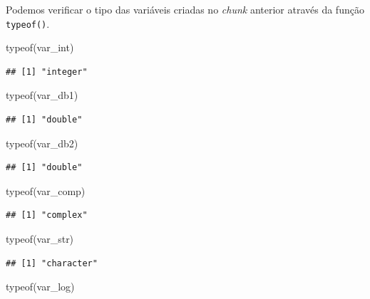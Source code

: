 \documentclass[
]{book}
\newenvironment{Shaded}{\begin{snugshade}}{\end{snugshade}}
\newcommand{\FunctionTok}[1]{\textcolor[rgb]{0.00,0.00,0.00}{#1}}
\newcommand{\NormalTok}[1]{#1}
\begin{document}
Podemos verificar o tipo das variáveis criadas no \emph{chunk} anterior através da função \texttt{typeof()}.

\begin{Shaded}
\begin{Highlighting}[]
\FunctionTok{typeof}\NormalTok{(var\_int)}
\end{Highlighting}
\end{Shaded}

\begin{verbatim}
## [1] "integer"
\end{verbatim}

\begin{Shaded}
\begin{Highlighting}[]
\FunctionTok{typeof}\NormalTok{(var\_db1)}
\end{Highlighting}
\end{Shaded}

\begin{verbatim}
## [1] "double"
\end{verbatim}

\begin{Shaded}
\begin{Highlighting}[]
\FunctionTok{typeof}\NormalTok{(var\_db2)}
\end{Highlighting}
\end{Shaded}

\begin{verbatim}
## [1] "double"
\end{verbatim}

\begin{Shaded}
\begin{Highlighting}[]
\FunctionTok{typeof}\NormalTok{(var\_comp)}
\end{Highlighting}
\end{Shaded}

\begin{verbatim}
## [1] "complex"
\end{verbatim}

\begin{Shaded}
\begin{Highlighting}[]
\FunctionTok{typeof}\NormalTok{(var\_str)}
\end{Highlighting}
\end{Shaded}

\begin{verbatim}
## [1] "character"
\end{verbatim}

\begin{Shaded}
\begin{Highlighting}[]
\FunctionTok{typeof}\NormalTok{(var\_log)}
\end{Highlighting}
\end{Shaded}
\end{document}
